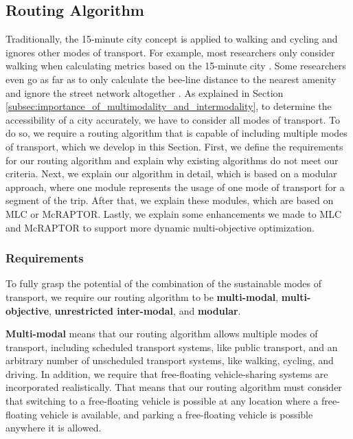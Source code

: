 \subsection{Routing Algorithm}
\label{subs:routing_algorithm}
Traditionally, the 15-minute city concept is applied to walking and cycling and ignores other modes of transport.
For example, most researchers only consider walking when calculating metrics based on the 15-minute city .
Some researchers even go as far as to only calculate the bee-line distance to the nearest amenity and ignore the street network altogether .
As explained in Section \ref{subsec:importance_of_multimodality_and_intermodality}, to determine the accessibility of a city accurately, we have to consider all modes of transport.
To do so, we require a routing algorithm that is capable of including multiple modes of transport, which we develop in this Section.
First, we define the requirements for our routing algorithm and explain why existing algorithms do not meet our criteria.
Next, we explain our algorithm in detail, which is based on a modular approach, where one module represents the usage of one mode of transport for a segment of the trip.
After that, we explain these modules, which are based on MLC or McRAPTOR.
Lastly, we explain some enhancements we made to MLC and McRAPTOR to support more dynamic multi-objective optimization.

\subsubsection{Requirements}
\label{subsubsec:requirements}

To fully grasp the potential of the combination of the sustainable modes of transport, we require our routing algorithm to be \textbf{multi-modal}, \textbf{multi-objective}, \textbf{unrestricted inter-modal}, and \textbf{modular}.

\textbf{Multi-modal} means that our routing algorithm allows multiple modes of transport, including scheduled transport systems, like public transport, and an arbitrary number of unscheduled transport systems, like walking, cycling, and driving.
In addition, we require that free-floating vehicle-sharing systems are incorporated realistically.
That means that our routing algorithm must consider that switching to a free-floating vehicle is possible at any location where a free-floating vehicle is available, and parking a free-floating vehicle is possible anywhere it is allowed.


